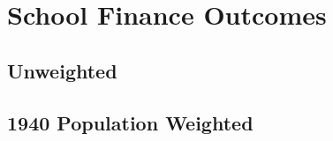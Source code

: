 \documentclass{article}
\begin{document}
%
%
%
%
%
%
%
%
%
%
%
%


\section{School Finance Outcomes}
\subsection{Unweighted}


\clearpage
\subsection{1940 Population Weighted}


\clearpage
\end{document}
